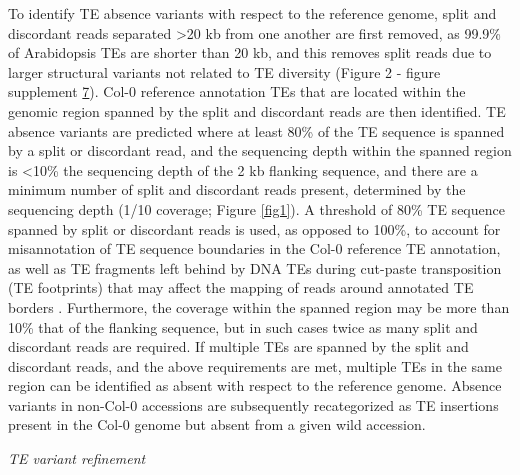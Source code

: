 \documentclass[12pt]{article}
\begin{document}
To identify TE absence variants with respect to the reference genome,
split and discordant reads separated \textgreater{}20 kb from one
another are first removed, as 99.9\% of Arabidopsis TEs are shorter
than 20 kb, and this removes split reads due to larger structural
variants not related to TE diversity (Figure 2 - figure supplement
\hyperref[fig2s7]{7}). Col-0 reference annotation TEs that are located
within the genomic region spanned by the split and discordant reads
are then identified. TE absence variants are predicted where at least
80\% of the TE sequence is spanned by a split or discordant read, and
the sequencing depth within the spanned region is \textless{}10\% the
sequencing depth of the 2 kb flanking sequence, and there are a
minimum number of split and discordant reads present, determined by
the sequencing depth (1/10 coverage; Figure \ref{fig1}). A threshold of 80\%
TE sequence spanned by split or discordant reads is used, as opposed
to 100\%, to account for misannotation of TE sequence boundaries in
the Col-0 reference TE annotation, as well as TE fragments left behind
by DNA TEs during cut-paste transposition (TE footprints) that may
affect the mapping of reads around annotated TE borders
\cite{Plasterk:1991vd}. Furthermore, the coverage within the spanned
region may be more than 10\% that of the flanking sequence, but in
such cases twice as many split and discordant reads are required. If
multiple TEs are spanned by the split and discordant reads, and the
above requirements are met, multiple TEs in the same region can be
identified as absent with respect to the reference genome. Absence
variants in non-Col-0 accessions are subsequently recategorized as TE
insertions present in the Col-0 genome but absent from a given wild
accession.

\emph{TE variant refinement}
\end{document}
